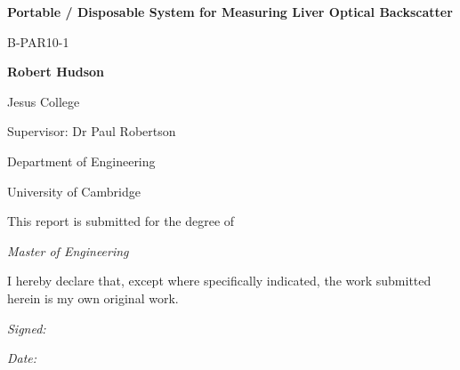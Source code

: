 \begin{titlepage}
    \begin{centering}
        \vspace{1cm}
        {\huge\bfseries Portable / Disposable System for Measuring Liver Optical Backscatter\par}
        \vspace{0.5cm}
        {\Large B-PAR10-1}\par
        \vspace{1cm}
        \vspace{1cm}
        {\Large\bfseries Robert Hudson}\par
        {\Large
        Jesus College\par
        \vspace{1cm}
        Supervisor: Dr Paul Robertson\par
        \vspace{1cm}
        Department of Engineering \par
        University of Cambridge \par
        \vspace{1cm}
        This report is submitted for the degree of \par
        {\em Master of Engineering}
        }

    \end{centering}
    \vfill

    {\footnotesize \noindent I hereby declare that, except where specifically indicated, the work submitted herein is my own original work.}\par
    \vspace{0.5cm}
    \begin{minipage}[t]{0.5\linewidth}
        {\small\textit{Signed:}\hrulefill}
    \end{minipage}
    \hfill
    \begin{minipage}[t]{0.3\linewidth}
        {\small\textit{Date:}}%
    \end{minipage}

\end{titlepage}